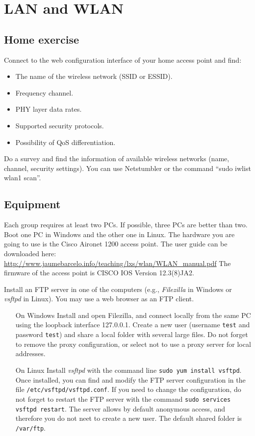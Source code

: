\chapter{LAN and WLAN}

\section{Home exercise}

Connect to the web configuration interface of your home access point and find:
\begin{itemize}
\item The name of the wireless network (SSID or ESSID).
\item Frequency channel.
\item PHY layer data rates.
\item Supported security protocols.
\item Possibility of QoS differentiation.
\end{itemize}

Do a survey and find the information of available wireless networks (name, channel, security settings).
You can use Netstumbler or the command ``sudo iwlist wlan1 scan''.

\section{Equipment}

Each group requires at least two PCs.
If possible, three PCs are better than two.
Boot one PC in Windows and the other one in Linux.
The hardware you are going to use is the Cisco Aironet 1200 access point.
The user guide can be downloaded here: \ifpdf \url{http://www.jaumebarcelo.info/teaching/lxs/wlan/WLAN_manual.pdf} \fi
The firmware of the access point is CISCO IOS Version 12.3(8)JA2.

Install an FTP server in one of the computers (e.g., \emph{Filezilla} in Windows or \emph{vsftpd} in Linux). You may use a web browser as an FTP client.

\begin{itemize}

\item[On Windows] Install and open Filezilla, and connect locally from the same PC using the loopback interface 127.0.0.1. Create a new user (username \texttt{test} and password \texttt{test}) and share a local folder with several large files. Do not forget to remove the proxy configuration, or select not to use a proxy server for local addresses.

\item[On Linux] Install \emph{vsftpd} with the command line \texttt{sudo yum install vsftpd}. Once installed, you can find and modify the FTP server configuration in the file \texttt{/etc/vsftpd/vsftpd.conf}. If you need to change the configuration, do not forget to restart the FTP server with the command \texttt{sudo services vsftpd restart}. The server allows by default anonymous access, and therefore you do not neet to create a new user. The default shared folder is \texttt{/var/ftp}.

\end{itemize}

